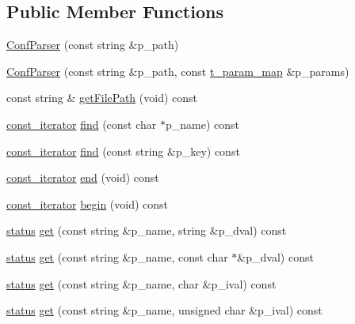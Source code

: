 \subsection*{Public Member Functions}
\begin{DoxyCompactItemize}
\item 
\hyperlink{classxtd_1_1ConfParser_a5f7729df32b946dba9690494b6fee762}{Conf\-Parser} (const string \&p\-\_\-path)
\item 
\hyperlink{classxtd_1_1ConfParser_a460c904cfe815a6141feb088022c9564}{Conf\-Parser} (const string \&p\-\_\-path, const \hyperlink{classxtd_1_1ConfParser_a715a3e39fd796046c94546e60f22414d}{t\-\_\-param\-\_\-map} \&p\-\_\-params)
\item 
const string \& \hyperlink{classxtd_1_1ConfParser_a2a72cefc513e103b86d90785862c620f}{get\-File\-Path} (void) const 
\item 
\hyperlink{classxtd_1_1ConfParser_1_1const__iterator}{const\-\_\-iterator} \hyperlink{classxtd_1_1ConfParser_a18acbfe7e5828eff045bdcc941626974}{find} (const char $\ast$p\-\_\-name) const 
\item 
\hyperlink{classxtd_1_1ConfParser_1_1const__iterator}{const\-\_\-iterator} \hyperlink{classxtd_1_1ConfParser_aff7ee8bcd3de4359eff719bc4a6570ba}{find} (const string \&p\-\_\-key) const 
\item 
\hyperlink{classxtd_1_1ConfParser_1_1const__iterator}{const\-\_\-iterator} \hyperlink{classxtd_1_1ConfParser_ab772ae8e571f1a3f719eca2f9d056d7c}{end} (void) const 
\item 
\hyperlink{classxtd_1_1ConfParser_1_1const__iterator}{const\-\_\-iterator} \hyperlink{classxtd_1_1ConfParser_a18fa4083def8aaf86796b9ddbc331daf}{begin} (void) const 
\item 
\hyperlink{namespacextd_a68ed4fe8e9c11116b68efe5b102aec50}{status} \hyperlink{classxtd_1_1ConfParser_a5ef18d8778c844ce60f2c93579be7926}{get} (const string \&p\-\_\-name, string \&p\-\_\-dval) const 
\item 
\hyperlink{namespacextd_a68ed4fe8e9c11116b68efe5b102aec50}{status} \hyperlink{classxtd_1_1ConfParser_ac8f46e56cdd5d015719c682707b12bc2}{get} (const string \&p\-\_\-name, const char $\ast$\&p\-\_\-dval) const 
\item 
\hyperlink{namespacextd_a68ed4fe8e9c11116b68efe5b102aec50}{status} \hyperlink{classxtd_1_1ConfParser_adaf860ed87b32df2ac16f73cab8bbbed}{get} (const string \&p\-\_\-name, char \&p\-\_\-ival) const 
\item 
\hyperlink{namespacextd_a68ed4fe8e9c11116b68efe5b102aec50}{status} \hyperlink{classxtd_1_1ConfParser_a6edfffe778ba93a7dc0ce3b71e1a293d}{get} (const string \&p\-\_\-name, unsigned char \&p\-\_\-ival) const 

\end{DoxyCompactItemize}
